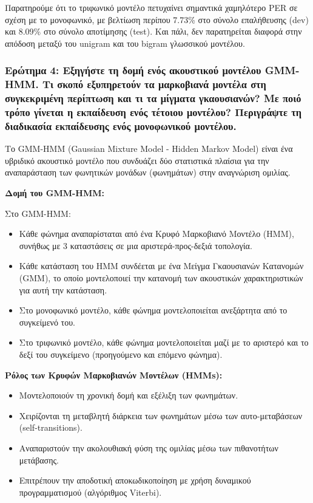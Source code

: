 \documentclass[a4paper,12pt]{article}
\begin{document}
Παρατηρούμε ότι το τριφωνικό μοντέλο πετυχαίνει σημαντικά χαμηλότερο PER σε σχέση με το μονοφωνικό, με βελτίωση περίπου 7.73\% στο σύνολο επαλήθευσης (dev) και 8.09\% στο σύνολο αποτίμησης (test). Και πάλι, δεν παρατηρείται διαφορά στην απόδοση μεταξύ του unigram και του bigram γλωσσικού μοντέλου.

\subsubsection*{Ερώτημα 4: Εξηγήστε τη δομή ενός ακουστικού μοντέλου GMM-HMM. Τι σκοπό εξυπηρετούν τα μαρκοβιανά μοντέλα στη συγκεκριμένη περίπτωση και τι τα μίγματα γκαουσιανών? Με ποιό τρόπο γίνεται η εκπαίδευση ενός τέτοιου μοντέλου? Περιγράψτε τη διαδικασία εκπαίδευσης ενός μονοφωνικού μοντέλου.}

Το GMM-HMM (Gaussian Mixture Model - Hidden Markov Model) είναι ένα υβριδικό ακουστικό μοντέλο που συνδυάζει δύο στατιστικά πλαίσια για την αναπαράσταση των φωνητικών μονάδων (φωνημάτων) στην αναγνώριση ομιλίας.

\textbf{Δομή του GMM-HMM:}

Στο GMM-HMM:
\begin{itemize}
    \item Κάθε φώνημα αναπαρίσταται από ένα Κρυφό Μαρκοβιανό Μοντέλο (HMM), συνήθως με 3 καταστάσεις σε μια αριστερά-προς-δεξιά τοπολογία.
    \item Κάθε κατάσταση του HMM συνδέεται με ένα Μείγμα Γκαουσιανών Κατανομών (GMM), το οποίο μοντελοποιεί την κατανομή των ακουστικών χαρακτηριστικών για αυτή την κατάσταση.
    \item Στο μονοφωνικό μοντέλο, κάθε φώνημα μοντελοποιείται ανεξάρτητα από το συγκείμενό του.
    \item Στο τριφωνικό μοντέλο, κάθε φώνημα μοντελοποιείται μαζί με το αριστερό και το δεξί του συγκείμενο (προηγούμενο και επόμενο φώνημα).
\end{itemize}

\textbf{Ρόλος των Κρυφών Μαρκοβιανών Μοντέλων (HMMs):}
\begin{itemize}
    \item Μοντελοποιούν τη χρονική δομή και εξέλιξη των φωνημάτων.
    \item Χειρίζονται τη μεταβλητή διάρκεια των φωνημάτων μέσω των αυτο-μεταβάσεων (self-transitions).
    \item Αναπαριστούν την ακολουθιακή φύση της ομιλίας μέσω των πιθανοτήτων μετάβασης.
    \item Επιτρέπουν την αποδοτική αποκωδικοποίηση με χρήση δυναμικού προγραμματισμού (αλγόριθμος Viterbi).
\end{itemize}
\end{document}

